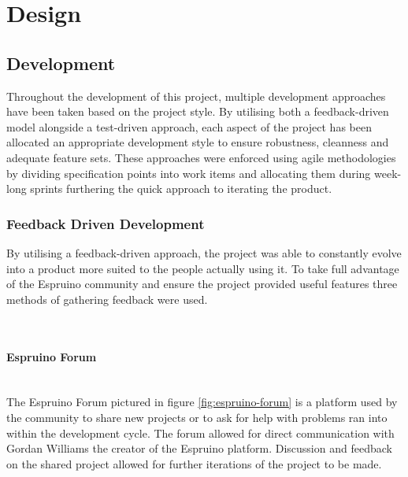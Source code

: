 \documentclass{l4proj}
\begin{document}
\chapter{Design}

\section{Development}

Throughout the development of this project, multiple development approaches have been taken based on the project style. By utilising both a feedback-driven model alongside a test-driven approach, each aspect of the project has been allocated an appropriate development style to ensure robustness, cleanness and adequate feature sets. These approaches were enforced using agile methodologies by dividing specification points into work items and allocating them during week-long sprints furthering the quick approach to iterating the product.

\subsection{Feedback Driven Development}
By utilising a feedback-driven approach, the project was able to constantly evolve into a product more suited to the people actually using it. To take full advantage of the Espruino community and ensure the project provided useful features three methods of gathering feedback were used.

\text \\

\subsubsection{Espruino Forum}\hfill\\
The Espruino Forum pictured in figure \ref{fig:espruino-forum} is a platform used by the community to share new projects or to ask for help with problems ran into within the development cycle. The forum allowed for direct communication with Gordan Williams the creator of the Espruino platform. Discussion and feedback on the shared project allowed for further iterations of the project to be made.
\end{document}

